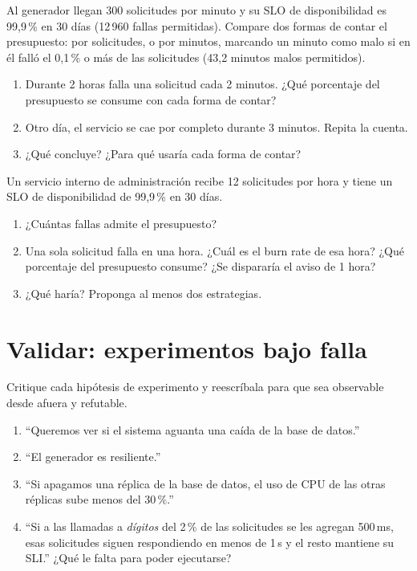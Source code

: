 \documentclass[variant=guia,cover=institutional,mode=screen]{ua-engineering-v6-article}
\begin{document}
\begin{uaexercise}
Al generador llegan 300 solicitudes por minuto y su SLO de disponibilidad es 99,9\,\% en 30 días (12\,960 fallas permitidas). Compare dos formas de contar el presupuesto: por solicitudes, o por minutos, marcando un minuto como malo si en él falló el 0,1\,\% o más de las solicitudes (43,2 minutos malos permitidos).
\begin{enumerate}
\item Durante 2 horas falla una solicitud cada 2 minutos. ¿Qué porcentaje del presupuesto se consume con cada forma de contar?
\item Otro día, el servicio se cae por completo durante 3 minutos. Repita la cuenta.
\item ¿Qué concluye? ¿Para qué usaría cada forma de contar?
\end{enumerate}
\end{uaexercise}

\begin{uaexercise}
Un servicio interno de administración recibe 12 solicitudes por hora y tiene un SLO de disponibilidad de 99,9\,\% en 30 días.
\begin{enumerate}
\item ¿Cuántas fallas admite el presupuesto?
\item Una sola solicitud falla en una hora. ¿Cuál es el burn rate de esa hora? ¿Qué porcentaje del presupuesto consume? ¿Se dispararía el aviso de 1 hora?
\item ¿Qué haría? Proponga al menos dos estrategias.
\end{enumerate}
\end{uaexercise}


\section{Validar: experimentos bajo falla}
\begin{uaexercise}
Critique cada hipótesis de experimento y reescríbala para que sea observable desde afuera y refutable.
\begin{enumerate}
\item ``Queremos ver si el sistema aguanta una caída de la base de datos.''
\item ``El generador es resiliente.''
\item ``Si apagamos una réplica de la base de datos, el uso de CPU de las otras réplicas sube menos del 30\,\%.''
\item ``Si a las llamadas a \emph{dígitos} del 2\,\% de las solicitudes se les agregan 500\,ms, esas solicitudes siguen respondiendo en menos de 1\,s y el resto mantiene su SLI.'' ¿Qué le falta para poder ejecutarse?
\end{enumerate}
\end{uaexercise}
\end{document}

